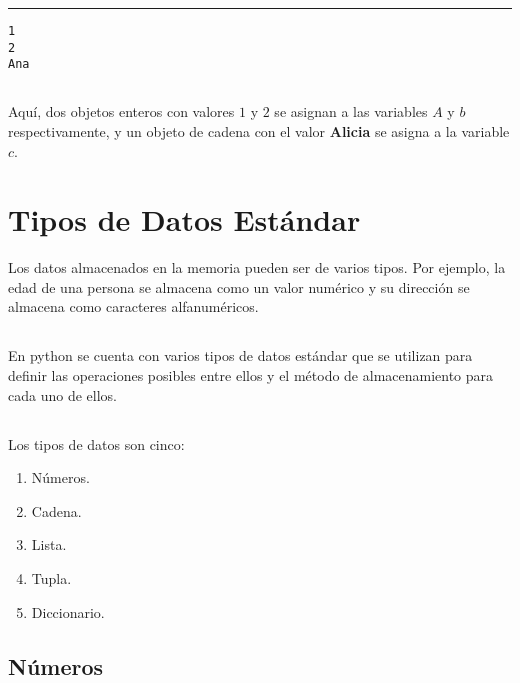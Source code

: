 \documentclass[]{article}
\providecommand{\tightlist}{%
  \setlength{\itemsep}{0pt}\setlength{\parskip}{0pt}}
\begin{document}
\begin{center}\rule{0.5\linewidth}{\linethickness}\end{center}

\begin{verbatim}
1
2
Ana
\end{verbatim}

\subsection{}\label{section-14}

Aquí, dos objetos enteros con valores \(1\) y \(2\) se asignan a las
variables \(A\) y \(b\) respectivamente, y un objeto de cadena con el
valor \textbf{Alicia} se asigna a la variable \(c\).

\section{Tipos de Datos Estándar}\label{tipos-de-datos-estuxe1ndar}

Los datos almacenados en la memoria pueden ser de varios tipos. Por
ejemplo, la edad de una persona se almacena como un valor numérico y su
dirección se almacena como caracteres alfanuméricos.

\subsection{}\label{section-15}

En python se cuenta con varios tipos de datos estándar que se utilizan
para definir las operaciones posibles entre ellos y el método de
almacenamiento para cada uno de ellos.

\subsection{}\label{section-16}

Los tipos de datos son cinco:

\begin{enumerate}
\def\labelenumi{\arabic{enumi}.}
\tightlist
\item
   Números.
\item
   Cadena.
\item
   Lista.
\item
   Tupla.
\item
   Diccionario.
\end{enumerate}

\subsection{Números}\label{nuxfameros}
\end{document}
